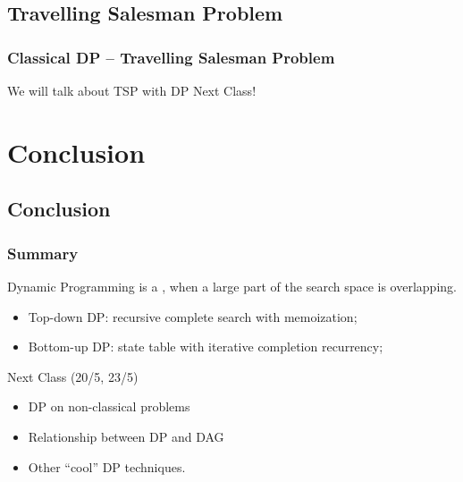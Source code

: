 \documentclass{beamer}
\begin{document}
\subsection{Travelling Salesman Problem}
\begin{frame}
  \frametitle{Classical DP -- Travelling Salesman Problem}

  We will talk about TSP with DP Next Class!
\end{frame}


\section{Conclusion}
\subsection{Conclusion}
\begin{frame}
   \frametitle{Summary}

   Dynamic Programming is a , when a large part of the search space is overlapping.

   \begin{itemize}
   \item \alert{Top-down DP}: recursive complete search with memoization;
   \item \alert{Bottom-up DP}: state table with iterative completion recurrency;
   \end{itemize}

   \vfill

   \begin{block}{Next Class (20/5, 23/5)}
     \begin{itemize}
     \item DP on non-classical problems
     \item Relationship between DP and DAG
     \item Other ``cool'' DP techniques.
     \end{itemize}
   \end{block}
\end{frame}
\end{document}
